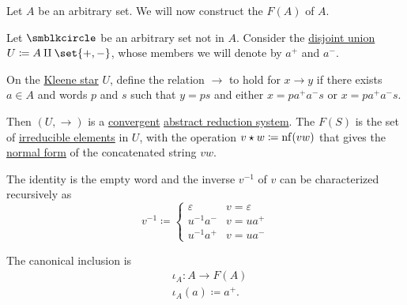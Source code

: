 \begin{definition}\label{def:free_group}
  Let \( A \) be an arbitrary set. We will now construct the  \( F(A) \) of \( A \).

  Let \( \anon \) be an arbitrary set not in \( A \). Consider the \hyperref[def:disjoint_union]{disjoint union} \( U \coloneqq A \amalg \set{ +, - } \), whose members we will denote by \( a^+ \) and \( a^- \).

  On the \hyperref[def:formal_language/kleene_star]{Kleene star} \( U \), define the relation \( \to \) to hold for \( x \to y \) if there exists \( a \in A \) and words \( p \) and \( s \) such that \( y = ps \) and either \( x = p a^+ a^- s \) or \( x = p a^+ a^- s \).

  Then \( (U, \to) \) is a \hyperref[def:abstract_rewriting_convergence/convergent]{convergent} \hyperref[def:abstract_reduction_system]{abstract reduction system}. The  \( F(S) \) is the set of \hyperref[def:abstract_reduction_system/hierarchy]{irreducible elements} in \( U \), with the operation \( v \star w \coloneqq \operatorname{nf}(vw) \) that gives the \hyperref[def:abstract_reduction_system/normal_form]{normal form} of the concatenated string \( vw \).

  The identity is the empty word and the inverse \( v^{-1} \) of \( v \) can be characterized recursively as
  \begin{equation*}
    v^{-1} \coloneqq \begin{cases}
      \varepsilon &v = \varepsilon \\
      u^{-1} a^-  &v = u a^+ \\
      u^{-1} a^+  &v = u a^-
    \end{cases}
  \end{equation*}

  The canonical inclusion is
  \begin{equation*}
    \begin{aligned}
      &\iota_A: A \to F(A) \\
      &\iota_A(a) \coloneqq a^+.
    \end{aligned}
  \end{equation*}
\end{definition}
